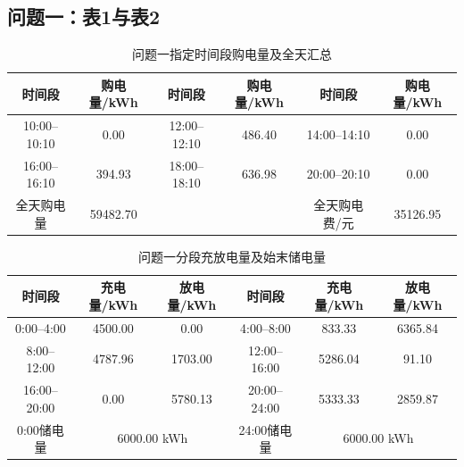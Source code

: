 \documentclass[12pt,a4paper,fontset=fandol]{ctexart}
\begin{document}
\subsection{问题一：表1与表2}
\begin{table}[htbp]
\centering\scriptsize
\caption{问题一指定时间段购电量及全天汇总}
\begin{tabular}{cc|cc|cc}
\toprule 时间段&购电量/kWh&时间段&购电量/kWh&时间段&购电量/kWh\\\midrule
10:00--10:10&0.00&12:00--12:10&486.40&14:00--14:10&0.00\\
16:00--16:10&394.93&18:00--18:10&636.98&20:00--20:10&0.00\\\midrule
全天购电量&59482.70&&&全天购电费/元&35126.95\\\bottomrule
\end{tabular}
\end{table}
\begin{table}[htbp]
\centering\scriptsize
\caption{问题一分段充放电量及始末储电量}
\begin{tabular}{ccc|ccc}
\toprule 时间段&充电量/kWh&放电量/kWh&时间段&充电量/kWh&放电量/kWh\\\midrule
0:00--4:00&4500.00&0.00&4:00--8:00&833.33&6365.84\\
8:00--12:00&4787.96&1703.00&12:00--16:00&5286.04&91.10\\
16:00--20:00&0.00&5780.13&20:00--24:00&5333.33&2859.87\\\midrule
0:00储电量&\multicolumn{2}{c|}{6000.00 kWh}&24:00储电量&\multicolumn{2}{c}{6000.00 kWh}\\\bottomrule
\end{tabular}
\end{table}

\iffalse
\end{document}

